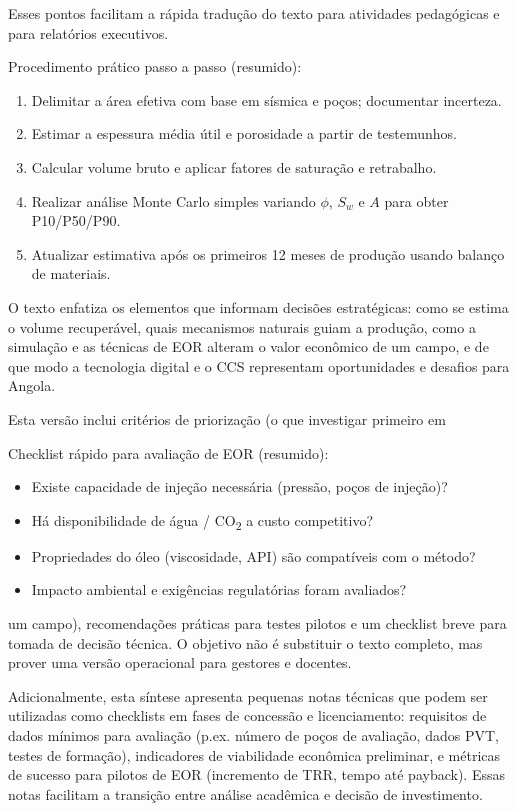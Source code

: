 \documentclass[
  12pt,
  a4paper,
  oneside,
  brazilian,
  sumario=tradicional
]{abntex2}
\begin{document}
Esses pontos facilitam a rápida tradução do texto para atividades pedagógicas
e para relatórios executivos.

Procedimento prático passo a passo (resumido):
\begin{enumerate}
  \item Delimitar a área efetiva com base em sísmica e poços; documentar incerteza.
  \item Estimar a espessura média útil e porosidade a partir de testemunhos.
  \item Calcular volume bruto e aplicar fatores de saturação e retrabalho.
  \item Realizar análise Monte Carlo simples variando $\phi$, $S_w$ e $A$ para obter
    P10/P50/P90.
  \item Atualizar estimativa após os primeiros 12 meses de produção usando
    balanço de materiais.
\end{enumerate}

O texto enfatiza os elementos que informam decisões estratégicas: como se
estima o volume recuperável, quais mecanismos naturais guiam a produção,
como a simulação e as técnicas de EOR alteram o valor econômico de um campo,
e de que modo a tecnologia digital e o CCS representam oportunidades e
desafios para Angola.

Esta versão inclui critérios de priorização (o que investigar primeiro em

Checklist rápido para avaliação de EOR (resumido):
\begin{itemize}
  \item Existe capacidade de injeção necessária (pressão, poços de injeção)?
  \item Há disponibilidade de água / CO\textsubscript{2} a custo competitivo?
  \item Propriedades do óleo (viscosidade, API) são compatíveis com o método?
  \item Impacto ambiental e exigências regulatórias foram avaliados?
\end{itemize}
um campo), recomendações práticas para testes pilotos e um checklist breve
para tomada de decisão técnica. O objetivo não é substituir o texto completo,
mas prover uma versão operacional para gestores e docentes.

Adicionalmente, esta síntese apresenta pequenas notas técnicas que podem ser
utilizadas como checklists em fases de concessão e licenciamento: requisitos
de dados mínimos para avaliação (p.ex. número de poços de avaliação, dados
PVT, testes de formação), indicadores de viabilidade econômica preliminar,
e métricas de sucesso para pilotos de EOR (incremento de TRR, tempo até
payback). Essas notas facilitam a transição entre análise acadêmica e
decisão de investimento.
\end{document}
